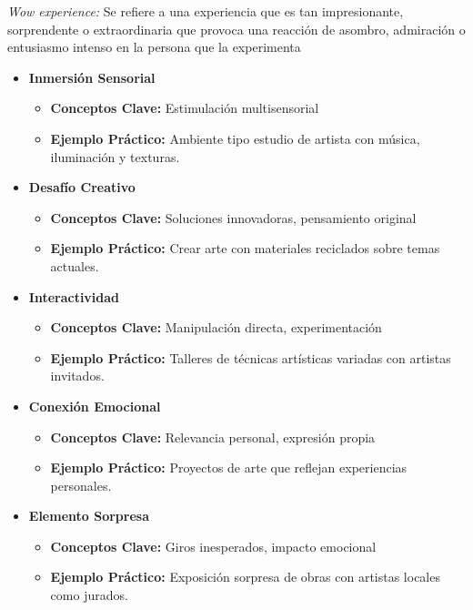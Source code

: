 \textit{Wow experience:} Se refiere a una experiencia que es tan impresionante, sorprendente o extraordinaria que provoca una reacción de asombro, admiración o entusiasmo intenso en la persona que la experimenta
\begin{itemize}[label={}]
    \item \textbf{Inmersión Sensorial}
    \begin{itemize}
        \item \textbf{Conceptos Clave:} Estimulación multisensorial
        \item \textbf{Ejemplo Práctico:} Ambiente tipo estudio de artista con música, iluminación y texturas.
    \end{itemize}
    
    \item \textbf{Desafío Creativo}
    \begin{itemize}
        \item \textbf{Conceptos Clave:} Soluciones innovadoras, pensamiento original
        \item \textbf{Ejemplo Práctico:} Crear arte con materiales reciclados sobre temas actuales.
    \end{itemize}
    
    \item \textbf{Interactividad}
    \begin{itemize}
        \item \textbf{Conceptos Clave:} Manipulación directa, experimentación
        \item \textbf{Ejemplo Práctico:} Talleres de técnicas artísticas variadas con artistas invitados.
    \end{itemize}
    
    \item \textbf{Conexión Emocional}
    \begin{itemize}
        \item \textbf{Conceptos Clave:} Relevancia personal, expresión propia
        \item \textbf{Ejemplo Práctico:} Proyectos de arte que reflejan experiencias personales.
    \end{itemize}
    
    \item \textbf{Elemento Sorpresa}
    \begin{itemize}
        \item \textbf{Conceptos Clave:} Giros inesperados, impacto emocional
        \item \textbf{Ejemplo Práctico:} Exposición sorpresa de obras con artistas locales como jurados.
    \end{itemize}
\end{itemize}







